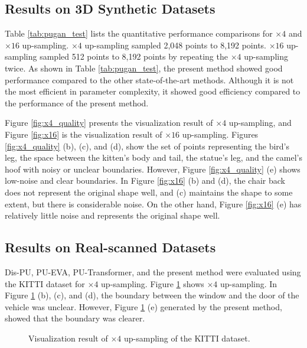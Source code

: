 \documentclass{article}
\begin{document}
\subsection{Results on 3D Synthetic Datasets}
\quad Table \ref{tab:pugan_test} lists the quantitative performance comparisons for $\times 4$ and $\times 16$ up-sampling. $\times 4$ up-sampling sampled 2,048 points to 8,192 points. $\times 16$ up-sampling sampled 512 points to 8,192 points by repeating the $\times 4$ up-sampling twice. As shown in Table \ref{tab:pugan_test}, the present method showed good performance compared to the other state-of-the-art methods. Although it is not the most efficient in parameter complexity, it showed good efficiency compared to the performance of the present method. 

\quad Figure \ref{fig:x4_quality} presents the visualization result of $\times 4$ up-sampling, and Figure \ref{fig:x16}  is the visualization result of $\times 16$ up-sampling. Figures \ref{fig:x4_quality} (b), (c), and (d), show the set of points representing the bird's leg, the space between the kitten's body and tail, the statue's leg, and the camel's hoof with noisy or unclear boundaries. However, Figure \ref{fig:x4_quality} (e) shows low-noise and clear boundaries. In Figure \ref{fig:x16} (b) and (d), the chair back does not represent the original shape well, and (c) maintains the shape to some extent, but there is considerable noise. On the other hand, Figure \ref{fig:x16} (e) has relatively little noise and represents the original shape well.

\subsection{Results on Real-scanned Datasets}
\quad Dis-PU, PU-EVA, PU-Transformer, and the present method were evaluated using the KITTI dataset for $\times 4$ up-sampling. Figure \ref{fig:kitti} shows $\times 4$ up-sampling. In Figure \ref{fig:kitti} (b), (c), and (d), the boundary between the window and the door of the vehicle was unclear. However, Figure \ref{fig:kitti} (e) generated by the present method, showed that the boundary was clearer.


\begin{figure}[htb!]
  \centering
  
  \caption{Visualization result of $\times 4$ up-sampling of the KITTI dataset.}
    \label{fig:kitti}
\end{figure}
\end{document}
